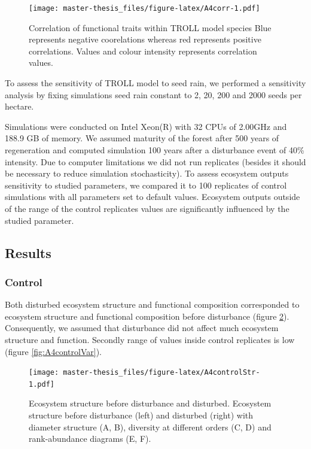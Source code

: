 \documentclass[12pt,]{article}
\theoremstyle{definition}
\theoremstyle{definition}
\theoremstyle{remark}
\begin{document}
\begin{figure}[htbp]
\centering
\texttt{[image: master-thesis\_files/figure-latex/A4corr-1.pdf]}
\caption{\label{fig:A4corr}Correlation of functional traits within TROLL
model species Blue represents negative coorelations whereas red
represents positive correlations. Values and colour intensity represents
correlation values.}
\end{figure}

To assess the sensitivity of TROLL model to seed rain, we performed a
sensitivity analysis by fixing simulations seed rain constant to 2, 20,
200 and 2000 seeds per hectare.

Simulations were conducted on Intel Xeon(R) with 32 CPUs of 2.00GHz and
188.9 GB of memory. We assumed maturity of the forest after 500 years of
regeneration \citep{Li} and computed simulation 100 years after a
disturbance event of 40\% intensity. Due to computer limitations we did
not run replicates (besides it should be necessary to reduce simulation
stochasticity). To assess ecosystem outputs sensitivity to studied
parameters, we compared it to 100 replicates of control simulations with
all parameters set to default values. Ecosystem outputs outside of the
range of the control replicates values are significantly influenced by
the studied parameter.

\subsection{Results}\label{results-2}

\subsubsection{Control}\label{control}

Both disturbed ecosystem structure and functional composition
corresponded to ecosystem structure and functional composition before
disturbance (figure \ref{fig:A4controlStr}). Consequently, we assumed
that disturbance did not affect much ecosystem structure and function.
Secondly range of values inside control replicates is low (figure
\ref{fig:A4controlVar}).

\begin{figure}[htbp]
\centering
\texttt{[image: master-thesis\_files/figure-latex/A4controlStr-1.pdf]}
\caption{\label{fig:A4controlStr}Ecosystem structure before disturbance and
disturbed. Ecosystem structure before disturbance (left) and disturbed
(right) with diameter structure (A, B), diversity at different orders
(C, D) and rank-abundance diagrams (E, F).}
\end{figure}
\end{document}
